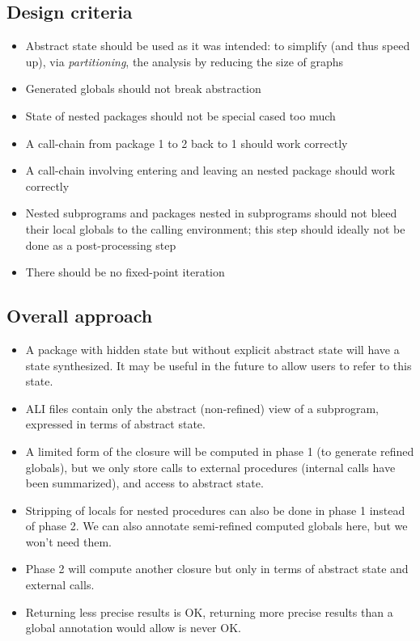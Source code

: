 \documentclass{article}
\begin{document}
\subsection{Design criteria}
\begin{itemize}
\item Abstract state should be used as it was intended: to simplify (and
  thus speed up), via \emph{partitioning}, the analysis by reducing the
  size of graphs

\item Generated globals should not break abstraction

\item State of nested packages should not be special cased too much

\item A call-chain from package 1 to 2 back to 1 should work correctly

\item A call-chain involving entering and leaving an nested package should
  work correctly

\item Nested subprograms and packages nested in subprograms should not
  bleed their local globals to the calling environment; this step should
  ideally not be done as a post-processing step

\item There should be no fixed-point iteration

\end{itemize}

\subsection{Overall approach}
\begin{itemize}
\item A package with hidden state but without explicit abstract state will
  have a state synthesized. It may be useful in the future to allow users
  to refer to this state.

\item ALI files contain only the abstract (non-refined) view of a
  subprogram, expressed in terms of abstract state.

\item A limited form of the closure will be computed in phase 1 (to
  generate refined globals), but we only store calls to external procedures
  (internal calls have been summarized), and access to abstract state.

\item Stripping of locals for nested procedures can also be done in phase 1
  instead of phase 2. We can also annotate semi-refined computed globals
  here, but we won't need them.

\item Phase 2 will compute another closure but only in terms of abstract
  state and external calls.

\item Returning less precise results is OK, returning more precise results
  than a global annotation would allow is never OK.
\end{itemize}
\end{document}
